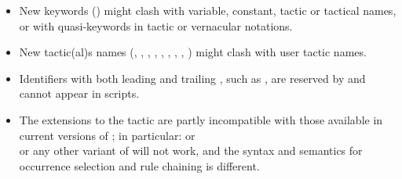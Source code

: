 \begin{itemize}
\item New keywords () might clash with variable, constant,
tactic or tactical names, or with quasi-keywords in tactic or
vernacular notations.
\item New tactic(al)s names (, , ,
  , ,
  , , , ) might clash
  with user tactic names.
\item Identifiers with both leading and trailing \ssrC{_}, such as ,
are reserved by \ssr{} and cannot appear in scripts.
\item The extensions to the  tactic are partly
incompatible with those available in current versions of \Coq{};
in particular:
 or \\  or any other
variant of  will not work, and the \ssr{} syntax and semantics for occurrence selection and
rule chaining is different.


\end{itemize}
